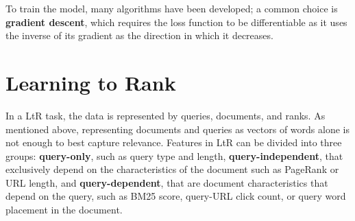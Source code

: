 To train the model, many algorithms have been developed; a common choice is \textbf{gradient descent}, which requires the loss function to be differentiable as it uses the inverse of its gradient as the direction in which it decreases.

\section{Learning to Rank}

In a LtR task, the data is represented by queries, documents, and ranks. As mentioned above, representing documents and queries as vectors of words alone is not enough to best capture relevance. Features in LtR can be divided into three groups: \textbf{query-only}, such as query type and length, \textbf{query-independent}, that exclusively depend on the characteristics of the document such as PageRank or URL length, and \textbf{query-dependent}, that are document characteristics that depend on the query, such as BM25 score, query-URL click count, or query word placement in the document.


